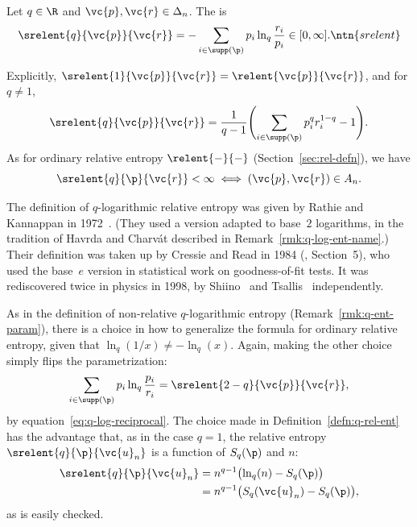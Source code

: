 \begin{defn}
Let $q \in \R$ and $\vc{p}, \vc{r} \in \Delta_n$.  The
 is
\[
\srelent{q}{\vc{p}}{\vc{r}}
=
- \sum_{i \in \supp(\p)} p_i \ln_q \frac{r_i}{p_i}  
\in
[0, \infty].
\ntn{srelent}
\]
\end{defn}

Explicitly, $\srelent{1}{\vc{p}}{\vc{r}} = \relent{\vc{p}}{\vc{r}}$, and
for $q \neq 1$,
\[
\srelent{q}{\vc{p}}{\vc{r}}
=
\frac{1}{q - 1} \Biggl(
\sum_{i \in \supp(\p)} p_i^q r_i^{1 - q} - 1 
\Biggr).
\]
As for ordinary relative entropy $\relent{-}{-}$
(Section~\ref{sec:rel-defn}), we have
\[
\srelent{q}{\p}{\vc{r}} < \infty
\iff
(\vc{p}, \vc{r}) \in A_n.
\]

The definition of $q$-logarithmic relative entropy was given by
Rathie%
%
% 
and Kannappan%
%
%   
in 1972~\cite{RaKa}.  (They used a version adapted to base~$2$ logarithms,
in the tradition of Havrda and Charv\'at described in
Remark~\ref{rmk:q-log-ent-name}.)  Their definition was taken up by Cressie
and Read in 1984 (\cite{CrRe}, Section~5), who used the base~$e$ version in
statistical work on goodness-of-fit tests.  It was rediscovered twice in
physics in 1998, by Shiino~\cite{Shii} and Tsallis~\cite{TsalGEB}
independently.

\begin{remark}
As in the definition of non-relative $q$-logarithmic entropy 
(Remark~\ref{rmk:q-ent-param}), there is a choice in how to generalize the
formula for ordinary relative entropy, given that $\ln_q(1/x) \neq
-\ln_q(x)$.  Again, making the other choice simply flips the
parametrization:
\[
\sum_{i \in \supp(\p)} p_i \ln_q \frac{p_i}{r_i}
=
\srelent{2 - q}{\vc{p}}{\vc{r}},
\]
by equation~\eqref{eq:q-log-reciprocal}.  The choice made in
Definition~\ref{defn:q-rel-ent} has the advantage that, as in the case $q =
1$, the relative entropy $\srelent{q}{\p}{\vc{u}_n}$ is a function of 
$S_q(\p)$ and $n$:
% 
\begin{align*}
\srelent{q}{\p}{\vc{u}_n}       &
=
n^{q - 1} \bigl( \ln_q(n) - S_q(\p) \bigr)      \\
&
=
n^{q - 1} \bigl( S_q(\vc{u}_n) - S_q(\p) \bigr),
\end{align*}
% 
as is easily checked.  
\end{remark}

